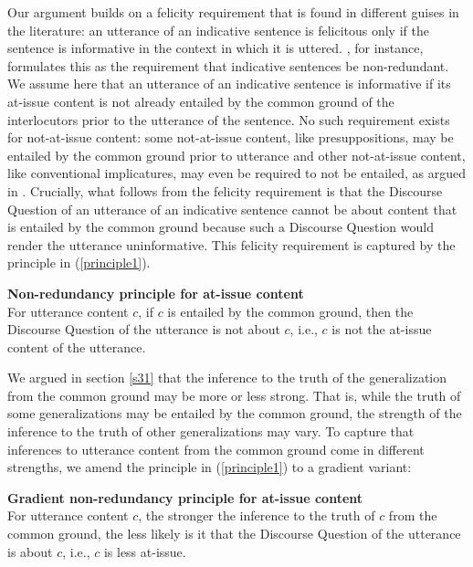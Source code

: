 \documentclass[11pt,fleqn]{article}
\newcommand{\6}{\mbox{$[\hspace*{-.6mm}[$}}
\newcommand{\9}{\mbox{$]\hspace*{-.6mm}]$}}
\begin{document}
 Our argument builds on a felicity requirement that is found in different guises in the literature: an utterance of an indicative sentence is felicitous only if the sentence is informative in the context in which it is uttered. \citet[144]{groenendijk1999}, for instance, formulates this as the requirement that indicative sentences be non-redundant. We assume here that an utterance of an indicative sentence is informative if its at-issue content is not already entailed by the common ground of the interlocutors prior to the utterance of the sentence. No such requirement exists for not-at-issue content: some not-at-issue content, like presuppositions, may be entailed by the common ground prior to utterance and other not-at-issue content, like conventional implicatures, may even be required to not be entailed, as argued in \citealt{potts05}. 
 Crucially, what follows from the felicity requirement is that the Discourse Question of an utterance of an indicative sentence cannot be about content that is entailed by the common ground because such a Discourse Question would render the utterance uninformative. This felicity requirement is captured by the principle in (\ref{principle1}).
 
\begin{exe}
\ex\label{principle1} {\bf Non-redundancy principle for at-issue content} \\ For utterance content $c$, if $c$ is entailed by the common ground, then the Discourse Question of the utterance is not about $c$, i.e., $c$ is not the at-issue content of the utterance. 
\end{exe}

We argued in section \ref{s31} that the inference to the truth of the generalization from the common ground may be more or less strong. That is, while the truth of some generalizations may be entailed by the common ground, the strength of the inference to the truth of other generalizations may vary. To capture that inferences to utterance content from the common ground come in different strengths, we amend the principle in (\ref{principle1}) to a gradient variant:

\begin{exe}

\ex\label{principle} {\bf Gradient non-redundancy principle for at-issue content} \\ For utterance content $c$, the stronger the inference to the truth of $c$ from the common ground, the less likely is it that the Discourse Question of the utterance is about $c$, i.e., $c$ is less at-issue.

\end{exe}
\end{document}

